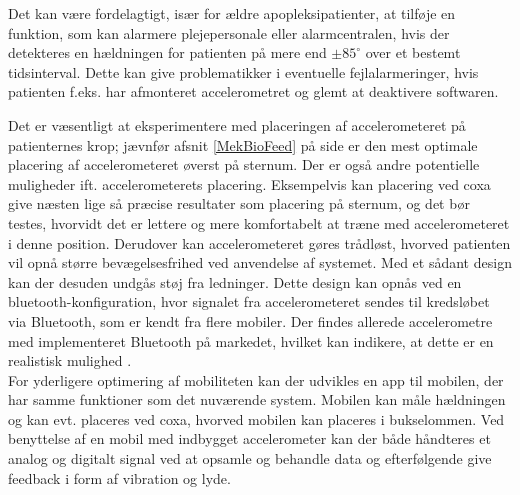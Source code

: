 Det kan være fordelagtigt, især for ældre apopleksipatienter, at tilføje en funktion, som kan alarmere plejepersonale eller alarmcentralen, hvis der detekteres en hældningen for patienten på mere end $\pm85^{\circ}$ over et bestemt tidsinterval. Dette kan give problematikker i eventuelle fejlalarmeringer, hvis patienten f.eks. har afmonteret accelerometret og glemt at deaktivere softwaren.

Det er væsentligt at eksperimentere med placeringen af accelerometeret på patienternes krop; jævnfør afsnit \ref{MekBioFeed} på side \pageref{MekBioFeed} er den mest optimale placering af accelerometeret øverst på sternum. Der er også andre potentielle muligheder ift. accelerometerets placering. Eksempelvis kan placering ved coxa give næsten lige så præcise resultater som placering på sternum, og det bør testes, hvorvidt det er lettere og mere komfortabelt at træne med accelerometeret i denne position\cite{Gjoreski2011}. Derudover kan accelerometeret gøres trådløst, hvorved patienten vil opnå større bevægelsesfrihed ved anvendelse af systemet. Med et sådant design kan der desuden undgås støj fra ledninger. Dette design kan opnås ved en bluetooth-konfiguration, hvor signalet fra accelerometeret sendes til kredsløbet via Bluetooth, som er kendt fra flere mobiler. Der findes allerede accelerometre med implementeret Bluetooth på markedet, hvilket kan indikere, at dette er en realistisk mulighed \cite{Axivity2015, Bioradio2015}. \\
For yderligere optimering af mobiliteten kan der udvikles en app til mobilen, der har samme funktioner som det nuværende system. Mobilen kan måle hældningen og kan evt. placeres ved coxa, hvorved mobilen kan placeres i bukselommen. Ved benyttelse af en mobil med indbygget accelerometer kan der både håndteres et analog og digitalt signal ved at opsamle og behandle data og efterfølgende give feedback i form af vibration og lyde. %